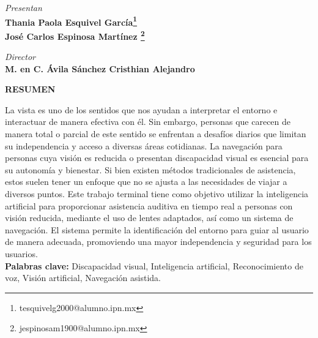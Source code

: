     
    {\fontsize{14pt}{14pt}\selectfont
    \begin{center}
    \textit{Presentan}\\
    \bf {Thania Paola Esquivel García\footnote{tesquivelg2000@alumno.ipn.mx}}\\
    \bf{José Carlos Espinosa Martínez \footnote{jespinosam1900@alumno.ipn.mx}}
    \end{center}
    }
    
    {\fontsize{14pt}{14pt}\selectfont
    \begin{center}
    \textit{Director}\\
    \bf {M. en C. Ávila Sánchez Cristhian Alejandro }
    \end{center}
    }
    
  
    {\fontsize{12pt}{14pt}\selectfont
    \begin{center}
    \textbf{RESUMEN}\\
    \end{center}
    La vista es uno de los sentidos que nos ayudan a interpretar el entorno e interactuar de manera efectiva con él. Sin embargo, personas que carecen de manera total o parcial de este sentido se enfrentan a desafíos diarios que limitan su independencia y acceso a diversas áreas cotidianas. La navegación para personas cuya visión es reducida o presentan discapacidad visual es esencial para su autonomía y bienestar. Si bien existen métodos tradicionales de asistencia, estos suelen tener un enfoque  que no se ajusta a las necesidades de viajar a diversos puntos. Este trabajo terminal tiene como objetivo utilizar la inteligencia artificial para proporcionar asistencia auditiva en tiempo real a personas con visión reducida, mediante el uso de lentes adaptados, así como un sistema de navegación. El sistema permite la identificación del entorno para guiar al usuario de manera adecuada, promoviendo una mayor independencia y seguridad para los usuarios.\\
    \textbf{Palabras clave:} Discapacidad visual, Inteligencia artificial, Reconocimiento de voz, Visión artificial, Navegación asistida.}